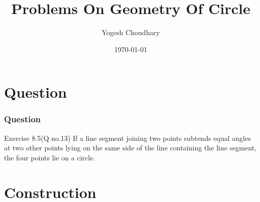 \documentclass{beamer}
\title{ Problems On Geometry Of Circle}
\author{Yogesh Choudhary}
\date{\today}
\begin{document}
	\begin{frame}
		\titlepage
	\end{frame}
	\section{Question}
	
	
		\begin{frame}
			\frametitle{Question}
			\begin{block}{Exercise 8.5(Q no.13)}
				If a line segment joining two points subtends equal angles at two other points lying on the same side of the line containing the line segment, the four points lie on a circle.
			\end{block}
		\end{frame}
	
	

	\section{\textbf{Construction}}
\end{document}
